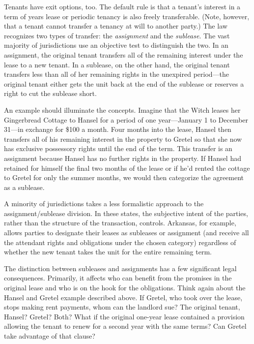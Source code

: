 Tenants have exit options, too.  The default rule is that a tenant's interest in
a term of years lease or periodic tenancy is also freely transferable.  (Note,
however, that a tenant cannot transfer a tenancy at will to another party.) 
The law recognizes two types of transfer: the \textit{assignment} and
the \textit{sublease}.  The vast majority of jurisdictions use an objective
test to distinguish the two.  In an assignment, the original tenant transfers
all of the remaining interest under the lease to a new tenant.  In a sublease,
on the other hand, the original tenant transfers less than all of her remaining
rights in the unexpired period---the original tenant either gets the unit back
at the end of the sublease or reserves a right to cut the sublease short.  

An example should illuminate the concepts.  Imagine that the Witch leases her
Gingerbread Cottage to Hansel for a period of one year---January 1 to December
31---in exchange for \$100 a month.  Four months into the lease, Hansel then
transfers all of his remaining interest in the property to Gretel so that she
now has exclusive possessory rights until the end of the term.  This transfer
is an assignment because Hansel has no further rights in the property.  If
Hansel had retained for himself the final two months of the lease or if he'd
rented the cottage to Gretel for only the summer months, we would then
categorize the agreement as a sublease.


A minority of jurisdictions takes a less formalistic approach to the
assignment/sublease division.  In these states, the subjective intent of the
parties, rather than the structure of the transaction, controls.  Arkansas, for
example, allows parties to designate their leases as subleases or assignment
(and receive all the attendant rights and obligations under the chosen
category) regardless of whether the new tenant takes the unit for the entire
remaining term.  

The distinction between subleases and assignments has a few significant legal
consequences.  Primarily, it affects who can benefit from the promises in the
original lease and who is on the hook for the obligations.  Think again about
the Hansel and Gretel example described above.  If Gretel, who took over the
lease, stops making rent payments, whom can the landlord sue?  The original
tenant, Hansel?  Gretel?  Both?  What if the original one-year lease contained
a provision allowing the tenant to renew for a second year with the same terms?
 Can Gretel take advantage of that clause?  

